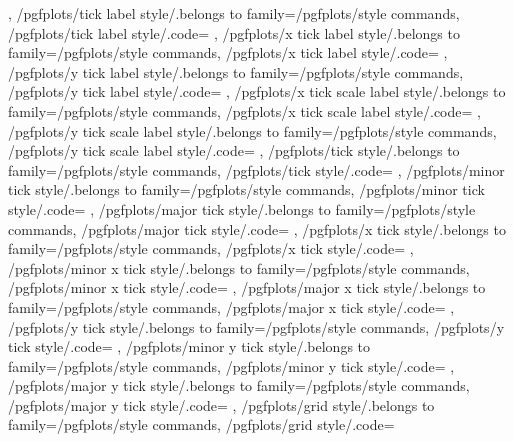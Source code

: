 {{	},
	/pgfplots/tick label style/.belongs to family=/pgfplots/style commands,
	/pgfplots/tick label style/.code={%
	},
	/pgfplots/x tick label style/.belongs to family=/pgfplots/style commands,
	/pgfplots/x tick label style/.code={%
	},
	/pgfplots/y tick label style/.belongs to family=/pgfplots/style commands,
	/pgfplots/y tick label style/.code={%
	},
	/pgfplots/x tick scale label style/.belongs to family=/pgfplots/style commands,
	/pgfplots/x tick scale label style/.code={%
	},
	/pgfplots/y tick scale label style/.belongs to family=/pgfplots/style commands,
	/pgfplots/y tick scale label style/.code={%
	},
	/pgfplots/tick style/.belongs to family=/pgfplots/style commands,
	/pgfplots/tick style/.code={%
	},
	/pgfplots/minor tick style/.belongs to family=/pgfplots/style commands,
	/pgfplots/minor tick style/.code={%
	},
	/pgfplots/major tick style/.belongs to family=/pgfplots/style commands,
	/pgfplots/major tick style/.code={%
	},
	/pgfplots/x tick style/.belongs to family=/pgfplots/style commands,
	/pgfplots/x tick style/.code={%
	},
	/pgfplots/minor x tick style/.belongs to family=/pgfplots/style commands,
	/pgfplots/minor x tick style/.code={%
	},
	/pgfplots/major x tick style/.belongs to family=/pgfplots/style commands,
	/pgfplots/major x tick style/.code={%
	},
	/pgfplots/y tick style/.belongs to family=/pgfplots/style commands,
	/pgfplots/y tick style/.code={%
	},
	/pgfplots/minor y tick style/.belongs to family=/pgfplots/style commands,
	/pgfplots/minor y tick style/.code={%
	},
	/pgfplots/major y tick style/.belongs to family=/pgfplots/style commands,
	/pgfplots/major y tick style/.code={%
	},
	/pgfplots/grid style/.belongs to family=/pgfplots/style commands,
	/pgfplots/grid style/.code={%
}}
